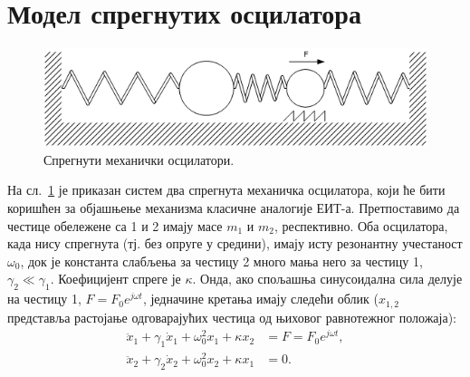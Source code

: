 \documentclass[main.tex]{subfiles}
\begin{document}
\section{Модел спрегнутих осцилатора}%
\label{sec:model_spregnutikh_ostsilatora}
\begin{figure}[h]
    \centering
    \includegraphics[width=0.8\linewidth]{sl_eit/opruge.png}
    \caption{Спрегнути механички осцилатори.}
    \label{fig:sl_eit/opruge}
\end{figure}
На сл.~\ref{fig:sl_eit/opruge} је приказан систем два спрегнута механичка осцилатора, који ће бити коришћен за објашњење механизма класичне аналогије ЕИТ-а. Претпоставимо да честице обележене са 1 и 2 имају масе $m_1$ и $m_2$, респективно. Оба осцилатора, када нису спрегнута (тј. без опруге у средини), имају исту резонантну учестаност $\omega_0$, док је константа слабљења за честицу 2 много мања него за честицу 1, $\gamma_2\ll\gamma_1$. Коефицијент спреге је $\kappa$. Онда, ако спољашња синусоидална сила делује на честицу 1, $F=F_0e^{j\omega t}$, једначине кретања имају следећи облик ($x_{1,2}$ представља растојање одговарајућих честица од њиховог равнотежног положаја):
\begin{align}
    \ddot x_1 + \gamma_1 \dot x_1 + \omega_0^2 x_1 + \kappa x_2 & = F = F_0 e^{j\omega t}, \label{eit:jkr1} \\
    \ddot x_2 + \gamma_2 \dot x_2 + \omega_0^2 x_2 + \kappa x_1 & = 0.\label{eit:jkr2}
\end{align}
\end{document}
